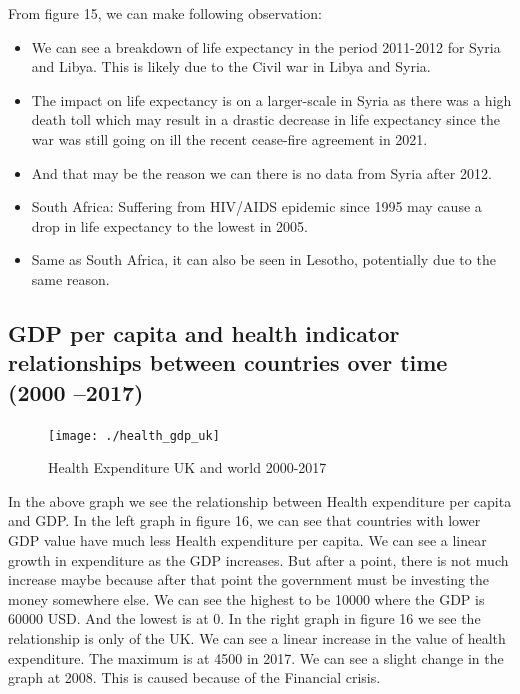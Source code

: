 \documentclass[
]{article}
\providecommand{\tightlist}{%
  \setlength{\itemsep}{0pt}\setlength{\parskip}{0pt}}
\begin{document}
From figure 15, we can make following observation:

\begin{itemize}
\tightlist
\item
  We can see a breakdown of life expectancy in the period 2011-2012 for
  Syria and Libya. This is likely due to the Civil war in Libya and
  Syria.
\item
  The impact on life expectancy is on a larger-scale in Syria as there
  was a high death toll which may result in a drastic decrease in life
  expectancy since the war was still going on ill the recent cease-fire
  agreement in 2021.
\item
  And that may be the reason we can there is no data from Syria after
  2012.
\item
  South Africa: Suffering from HIV/AIDS epidemic since 1995 may cause a
  drop in life expectancy to the lowest in 2005.
\item
  Same as South Africa, it can also be seen in Lesotho, potentially due
  to the same reason.
\end{itemize}

\hypertarget{gdp-per-capita-and-health-indicator-relationships-between-countries-over-time-2000-2017}{%
\subsection{GDP per capita and health indicator relationships between
countries over time (2000
--2017)}\label{gdp-per-capita-and-health-indicator-relationships-between-countries-over-time-2000-2017}}

\begin{figure}[H]

{\centering \texttt{[image: ./health\_gdp\_uk]} 

}

\caption{Health Expenditure UK and world 2000-2017}\label{fig:plot16}
\end{figure}

In the above graph we see the relationship between Health expenditure
per capita and GDP. In the left graph in figure 16, we can see that
countries with lower GDP value have much less Health expenditure per
capita. We can see a linear growth in expenditure as the GDP increases.
But after a point, there is not much increase maybe because after that
point the government must be investing the money somewhere else. We can
see the highest to be 10000 where the GDP is 60000 USD. And the lowest
is at 0. In the right graph in figure 16 we see the relationship is only
of the UK. We can see a linear increase in the value of health
expenditure. The maximum is at 4500 in 2017. We can see a slight change
in the graph at 2008. This is caused because of the Financial crisis.
\end{document}
